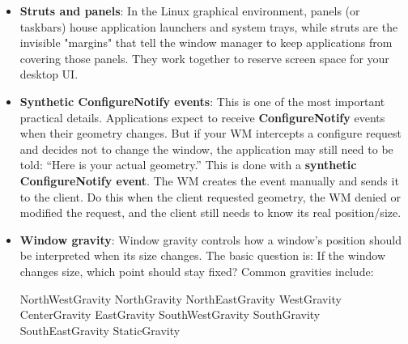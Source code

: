 \documentclass{report}
\begin{document}
\begin{itemize}
\begin{itemize}
                \item screen bounds
                \item struts/panels
            \end{itemize}
        \item \textbf{Struts and panels}: In the Linux graphical environment, panels (or taskbars) house application launchers and system trays, while struts are the invisible "margins" that tell the window manager to keep applications from covering those panels. They work together to reserve screen space for your desktop UI. 
        \item \textbf{Synthetic ConfigureNotify events}: This is one of the most important practical details.
            \bigbreak \noindent 
            Applications expect to receive \textbf{ConfigureNotify} events when their geometry changes. But if your WM intercepts a configure request and decides not to change the window, the application may still need to be told: “Here is your actual geometry.”
            \bigbreak \noindent 
            This is done with a \textbf{synthetic ConfigureNotify event}. The WM creates the event manually and sends it to the client. Do this when the client requested geometry, the WM denied or modified the request, and the client still needs to know its real position/size.
        \item \textbf{Window gravity}: Window gravity controls how a window’s position should be interpreted when its size changes. The basic question is: If the window changes size, which point should stay fixed?
            \bigbreak \noindent 
            Common gravities include:
            \bigbreak \noindent 
            \begin{cppcode}
                NorthWestGravity
                NorthGravity
                NorthEastGravity
                WestGravity
                CenterGravity
                EastGravity
                SouthWestGravity
                SouthGravity
                SouthEastGravity
                StaticGravity
            \end{cppcode}
    \end{itemize}
\end{document}
